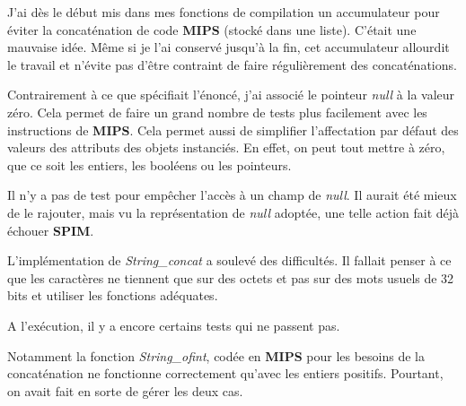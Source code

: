 \documentclass{article}
\begin{document}
J'ai dès le début mis dans mes fonctions de compilation un accumulateur pour éviter la
concaténation de code \textbf{MIPS} (stocké dans une liste). C'était une
mauvaise idée. Même si je l'ai conservé jusqu'à la fin, cet accumulateur
allourdit le travail et n'évite pas d'être contraint de faire régulièrement
des concaténations.

Contrairement à ce que spécifiait l'énoncé, j'ai associé le pointeur
\emph{null} à
la valeur zéro. Cela permet de faire un grand nombre de tests plus
facilement avec les instructions de \textbf{MIPS}. Cela permet aussi de
simplifier l'affectation par défaut des valeurs des attributs des objets
instanciés. En effet, on peut tout mettre à zéro, que ce soit les entiers,
les booléens ou les pointeurs.

Il n'y a pas de test pour empêcher l'accès à un champ de \emph{null}. Il
aurait
été mieux de le rajouter, mais vu la représentation de \emph{null} adoptée,
une telle action fait déjà échouer \textbf{SPIM}.

L'implémentation de \emph{String\_concat} a soulevé des difficultés. Il
fallait penser à ce que les caractères ne tiennent que sur des octets et
pas sur des mots usuels de 32 bits et utiliser les fonctions adéquates.

A l'exécution, il y a encore certains tests qui ne passent pas.

Notamment la fonction \emph{String\_ofint}, codée en \textbf{MIPS} pour les
besoins de la concaténation ne fonctionne correctement qu'avec les entiers
positifs. Pourtant, on avait fait en sorte de gérer les deux cas.
\end{document}
